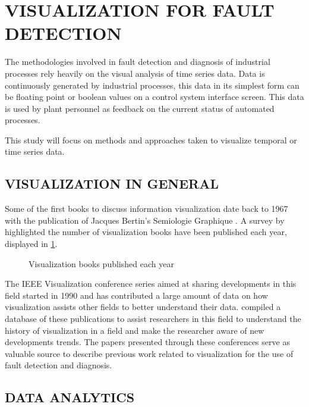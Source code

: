 \section{VISUALIZATION FOR FAULT DETECTION}

The methodologies involved in fault detection and diagnosis of industrial processes rely heavily on the visual analysis of time series data. Data is continuously generated by industrial processes, this data in its simplest form can be floating point or boolean values on a control system interface screen. This data is used by plant personnel as feedback on the current status of automated processes.

This study will focus on methods and approaches taken to visualize temporal or time series data. 




\subsection{VISUALIZATION IN GENERAL}

Some of the first books to discuss information visualization date back to 1967 with the publication of Jacques Bertin's Semiologie Graphique \cite{rees2019survey}. A survey by \cite{rees2019survey} highlighted the number of visualization books have been published each year, displayed in \ref{fig:1}.

\begin{figure}[!ht]
	
	\centering{}
	\caption{Visualization books published each year}\label{fig:1}
	
\end{figure}

The IEEE Visualization conference series aimed at sharing developments in this field started in 1990 and has contributed a large amount of data on how visualization assists other fields to better understand their data. \cite{isenberg2016vispubdata} compiled a database of these publications to assist researchers in this field to understand the history of visualization in a field and make the researcher aware of new developments trends. The papers presented through these conferences serve as valuable source to describe previous work related to visualization for the use of fault detection and diagnosis.

\subsection{DATA ANALYTICS}

